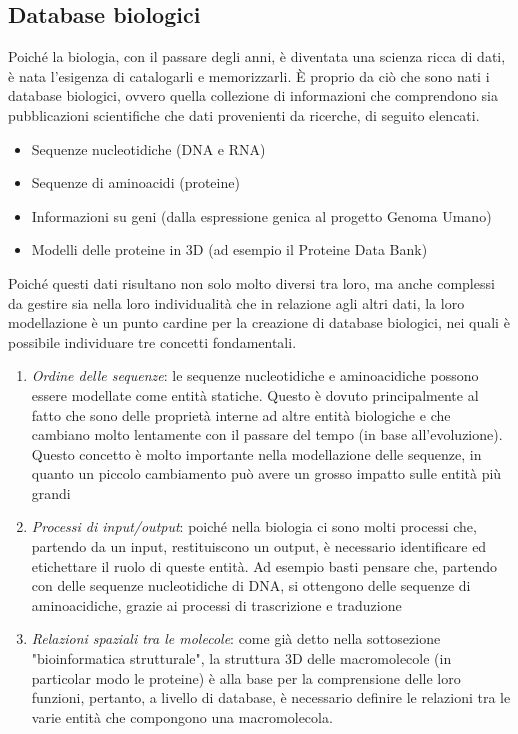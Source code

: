 \subsection{Database biologici}
Poiché la biologia, con il passare degli anni, è diventata una scienza ricca di dati, è nata l'esigenza di catalogarli e memorizzarli. \`E proprio da ciò che sono nati i database biologici, ovvero quella collezione di informazioni che comprendono sia pubblicazioni scientifiche che dati provenienti da ricerche, di seguito elencati.
\begin{itemize}
	\item Sequenze nucleotidiche (DNA e RNA)
	\item Sequenze di aminoacidi (proteine)
	\item Informazioni su geni (dalla espressione genica al progetto Genoma Umano)
	\item Modelli delle proteine in 3D (ad esempio il Proteine Data Bank\cite{proteineDataBank})
\end{itemize}
Poiché questi dati risultano non solo molto diversi tra loro, ma anche complessi da gestire sia nella loro individualità che in relazione agli altri dati, la loro modellazione è un punto cardine per la creazione di database biologici, nei quali è possibile individuare tre concetti fondamentali.
\begin{enumerate}
	\item \textit{Ordine delle sequenze}: le sequenze nucleotidiche e aminoacidiche possono essere modellate come entità statiche. Questo è dovuto principalmente al fatto che sono delle proprietà interne ad altre entità biologiche e che cambiano molto lentamente con il passare del tempo (in base all'evoluzione).
	\newline
	Questo concetto è molto importante nella modellazione delle sequenze, in quanto un piccolo cambiamento può avere un grosso impatto sulle entità più grandi
	\item \textit{Processi di input/output}: poiché nella biologia ci sono molti processi che, partendo da un input, restituiscono un output, è necessario identificare ed etichettare il ruolo di queste entità. Ad esempio basti pensare che, partendo con delle sequenze nucleotidiche di DNA, si ottengono delle sequenze di aminoacidiche, grazie ai processi di trascrizione e traduzione
	\item \textit{Relazioni spaziali tra le molecole}: come già detto nella sottosezione "bioinformatica strutturale", la struttura 3D delle macromolecole (in particolar modo le proteine) è alla base per la comprensione delle loro funzioni, pertanto, a livello di database, è necessario definire le relazioni tra le varie entità che compongono una macromolecola.
\end{enumerate}
